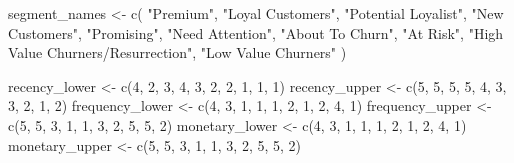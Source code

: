 \documentclass[
]{book}
\newenvironment{Shaded}{\begin{snugshade}}{\end{snugshade}}
\newcommand{\DecValTok}[1]{\textcolor[rgb]{0.00,0.00,0.81}{#1}}
\newcommand{\FunctionTok}[1]{\textcolor[rgb]{0.00,0.00,0.00}{#1}}
\newcommand{\NormalTok}[1]{#1}
\newcommand{\OtherTok}[1]{\textcolor[rgb]{0.56,0.35,0.01}{#1}}
\newcommand{\StringTok}[1]{\textcolor[rgb]{0.31,0.60,0.02}{#1}}
\begin{document}
\begin{Shaded}
\begin{Highlighting}[]
\NormalTok{segment\_names }\OtherTok{\textless{}{-}}
    \FunctionTok{c}\NormalTok{(}
        \StringTok{"Premium"}\NormalTok{,}
        \StringTok{"Loyal Customers"}\NormalTok{,}
        \StringTok{"Potential Loyalist"}\NormalTok{,}
        \StringTok{"New Customers"}\NormalTok{,}
        \StringTok{"Promising"}\NormalTok{,}
        \StringTok{"Need Attention"}\NormalTok{,}
        \StringTok{"About To Churn"}\NormalTok{,}
        \StringTok{"At Risk"}\NormalTok{,}
        \StringTok{"High Value Churners/Resurrection"}\NormalTok{,}
        \StringTok{"Low Value Churners"}
\NormalTok{    )}

\NormalTok{recency\_lower }\OtherTok{\textless{}{-}} \FunctionTok{c}\NormalTok{(}\DecValTok{4}\NormalTok{, }\DecValTok{2}\NormalTok{, }\DecValTok{3}\NormalTok{, }\DecValTok{4}\NormalTok{, }\DecValTok{3}\NormalTok{, }\DecValTok{2}\NormalTok{, }\DecValTok{2}\NormalTok{, }\DecValTok{1}\NormalTok{, }\DecValTok{1}\NormalTok{, }\DecValTok{1}\NormalTok{)}
\NormalTok{recency\_upper }\OtherTok{\textless{}{-}} \FunctionTok{c}\NormalTok{(}\DecValTok{5}\NormalTok{, }\DecValTok{5}\NormalTok{, }\DecValTok{5}\NormalTok{, }\DecValTok{5}\NormalTok{, }\DecValTok{4}\NormalTok{, }\DecValTok{3}\NormalTok{, }\DecValTok{3}\NormalTok{, }\DecValTok{2}\NormalTok{, }\DecValTok{1}\NormalTok{, }\DecValTok{2}\NormalTok{)}
\NormalTok{frequency\_lower }\OtherTok{\textless{}{-}} \FunctionTok{c}\NormalTok{(}\DecValTok{4}\NormalTok{, }\DecValTok{3}\NormalTok{, }\DecValTok{1}\NormalTok{, }\DecValTok{1}\NormalTok{, }\DecValTok{1}\NormalTok{, }\DecValTok{2}\NormalTok{, }\DecValTok{1}\NormalTok{, }\DecValTok{2}\NormalTok{, }\DecValTok{4}\NormalTok{, }\DecValTok{1}\NormalTok{)}
\NormalTok{frequency\_upper }\OtherTok{\textless{}{-}} \FunctionTok{c}\NormalTok{(}\DecValTok{5}\NormalTok{, }\DecValTok{5}\NormalTok{, }\DecValTok{3}\NormalTok{, }\DecValTok{1}\NormalTok{, }\DecValTok{1}\NormalTok{, }\DecValTok{3}\NormalTok{, }\DecValTok{2}\NormalTok{, }\DecValTok{5}\NormalTok{, }\DecValTok{5}\NormalTok{, }\DecValTok{2}\NormalTok{)}
\NormalTok{monetary\_lower }\OtherTok{\textless{}{-}} \FunctionTok{c}\NormalTok{(}\DecValTok{4}\NormalTok{, }\DecValTok{3}\NormalTok{, }\DecValTok{1}\NormalTok{, }\DecValTok{1}\NormalTok{, }\DecValTok{1}\NormalTok{, }\DecValTok{2}\NormalTok{, }\DecValTok{1}\NormalTok{, }\DecValTok{2}\NormalTok{, }\DecValTok{4}\NormalTok{, }\DecValTok{1}\NormalTok{)}
\NormalTok{monetary\_upper }\OtherTok{\textless{}{-}} \FunctionTok{c}\NormalTok{(}\DecValTok{5}\NormalTok{, }\DecValTok{5}\NormalTok{, }\DecValTok{3}\NormalTok{, }\DecValTok{1}\NormalTok{, }\DecValTok{1}\NormalTok{, }\DecValTok{3}\NormalTok{, }\DecValTok{2}\NormalTok{, }\DecValTok{5}\NormalTok{, }\DecValTok{5}\NormalTok{, }\DecValTok{2}\NormalTok{)}


\end{Highlighting}
\end{Shaded}
\end{document}
